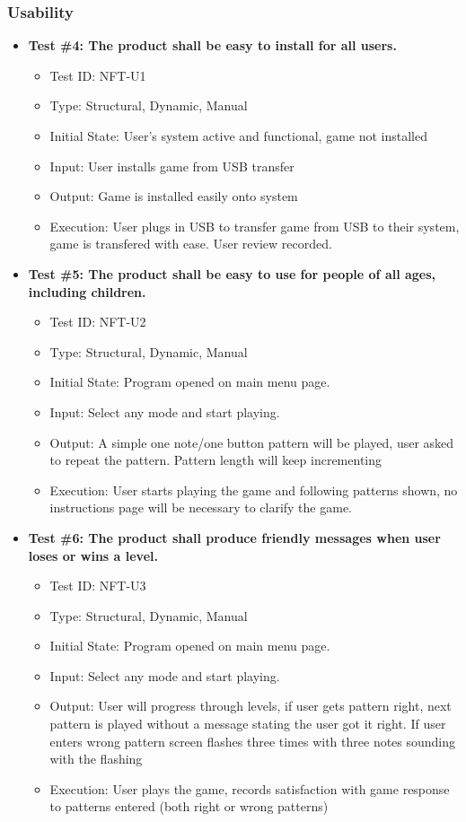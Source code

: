 \documentclass[12pt, titlepage]{article}
\begin{document}
\subsubsection{Usability}
\begin{itemize}
\item \textbf{Test \#4: The product shall be easy to install for all users.}
\begin{itemize}
\item Test ID: NFT-U1
\item Type: Structural, Dynamic, Manual			
\item Initial State: User's system active and functional, game not installed 		
\item Input: User installs game from USB transfer			
\item Output: Game is installed easily onto system				
\item Execution: User plugs in USB to transfer game from USB to their system, game is transfered with ease. User review recorded.
\end{itemize}

\item \textbf{Test \#5: The product shall be easy to use for people of all ages, including children.}
\begin{itemize}
\item Test ID: NFT-U2
\item Type: Structural, Dynamic, Manual				
\item Initial State: Program opened on main menu page.		
\item Input: Select any mode and start playing.
\item Output: A simple one note/one button pattern will be played, user asked to repeat the pattern. Pattern length will keep incrementing
\item Execution: User starts playing the game and following patterns shown, no instructions page will be necessary to clarify the game.
\end{itemize}

\item \textbf{Test \#6: The product shall produce friendly messages when user loses or wins a level.}
\begin{itemize}
\item Test ID: NFT-U3
\item Type: Structural, Dynamic, Manual				
\item Initial State: Program opened on main menu page.		
\item Input: Select any mode and start playing.
\item Output: User will progress through levels, if user gets pattern right, next pattern is played without a message stating the user got it right. If user enters wrong pattern screen flashes three times with three notes sounding with the flashing
\item Execution: User plays the game, records satisfaction with game response to patterns entered (both right or wrong patterns)
\end{itemize}


\end{itemize}
\end{document}
